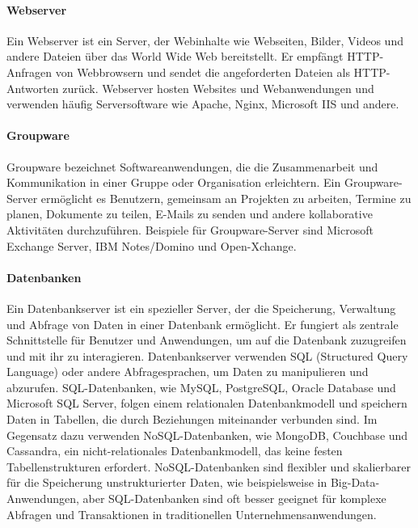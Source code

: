 \paragraph{Webserver}

Ein Webserver ist ein Server, der Webinhalte wie Webseiten, Bilder, Videos und andere Dateien über das World Wide Web bereitstellt. Er empfängt HTTP-Anfragen von Webbrowsern und sendet die angeforderten Dateien als HTTP-Antworten zurück. Webserver hosten Websites und Webanwendungen und verwenden häufig Serversoftware wie Apache, Nginx, Microsoft IIS und andere.

\paragraph{Groupware}

Groupware bezeichnet Softwareanwendungen, die die Zusammenarbeit und Kommunikation in einer Gruppe oder Organisation erleichtern. Ein Groupware-Server ermöglicht es Benutzern, gemeinsam an Projekten zu arbeiten, Termine zu planen, Dokumente zu teilen, E-Mails zu senden und andere kollaborative Aktivitäten durchzuführen. Beispiele für Groupware-Server sind Microsoft Exchange Server, IBM Notes/Domino und Open-Xchange.

\paragraph{Datenbanken}

Ein Datenbankserver ist ein spezieller Server, der die Speicherung, Verwaltung und Abfrage von Daten in einer Datenbank ermöglicht. Er fungiert als zentrale Schnittstelle für Benutzer und Anwendungen, um auf die Datenbank zuzugreifen und mit ihr zu interagieren. Datenbankserver verwenden SQL (Structured Query Language) oder andere Abfragesprachen, um Daten zu manipulieren und abzurufen. SQL-Datenbanken, wie MySQL, PostgreSQL, Oracle Database und Microsoft SQL Server, folgen einem relationalen Datenbankmodell und speichern Daten in Tabellen, die durch Beziehungen miteinander verbunden sind. Im Gegensatz dazu verwenden NoSQL-Datenbanken, wie MongoDB, Couchbase und Cassandra, ein nicht-relationales Datenbankmodell, das keine festen Tabellenstrukturen erfordert. NoSQL-Datenbanken sind flexibler und skalierbarer für die Speicherung unstrukturierter Daten, wie beispielsweise in Big-Data-Anwendungen, aber SQL-Datenbanken sind oft besser geeignet für komplexe Abfragen und Transaktionen in traditionellen Unternehmensanwendungen.

